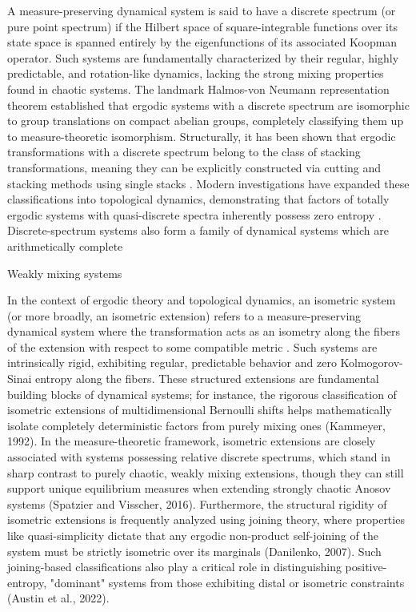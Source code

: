 \documentclass[12pt,oneside,pb-diagram]{article}
\begin{document}
\begin{Erg}{}{} 
	A measure-preserving dynamical system is said to have a discrete spectrum (or pure point spectrum) if the Hilbert space of square-integrable functions over its state space is spanned entirely by the eigenfunctions of its associated Koopman operator. Such systems are fundamentally characterized by their regular, highly predictable, and rotation-like dynamics, lacking the strong mixing properties found in chaotic systems. The landmark Halmos-von Neumann representation theorem established that ergodic systems with a discrete spectrum are isomorphic to group translations on compact abelian groups, completely classifying them up to measure-theoretic isomorphism. Structurally, it has been shown that ergodic transformations with a discrete spectrum belong to the class of stacking transformations, meaning they can be explicitly constructed via cutting and stacking methods using single stacks \cite{DelJunco1976}. Modern investigations have expanded these classifications into topological dynamics, demonstrating that factors of totally ergodic systems with quasi-discrete spectra inherently possess zero entropy \cite{HaaseMoriakov2018}. Discrete-spectrum systems also form a family of dynamical systems which are  arithmetically complete \cite[e.g.]{Furstenberg1967}
\end{Erg}

\begin{Erg}{}{} 
	Weakly mixing systems
\end{Erg}

\begin{Erg}{}{} 
	In the context of ergodic theory and topological dynamics, an isometric system (or more broadly, an isometric extension) refers to a measure-preserving dynamical system where the transformation acts as an isometry along the fibers of the extension with respect to some compatible metric \cite{glasner1978exist}. Such systems are intrinsically rigid, exhibiting regular, predictable behavior and zero Kolmogorov-Sinai entropy along the fibers. These structured extensions are fundamental building blocks of dynamical systems; for instance, the rigorous classification of isometric extensions of multidimensional Bernoulli shifts helps mathematically isolate completely deterministic factors from purely mixing ones (Kammeyer, 1992). In the measure-theoretic framework, isometric extensions are closely associated with systems possessing relative discrete spectrums, which stand in sharp contrast to purely chaotic, weakly mixing extensions, though they can still support unique equilibrium measures when extending strongly chaotic Anosov systems (Spatzier and Visscher, 2016). Furthermore, the structural rigidity of isometric extensions is frequently analyzed using joining theory, where properties like quasi-simplicity dictate that any ergodic non-product self-joining of the system must be strictly isometric over its marginals (Danilenko, 2007). Such joining-based classifications also play a critical role in distinguishing positive-entropy, "dominant" systems from those exhibiting distal or isometric constraints (Austin et al., 2022).
\end{Erg}
\end{document}
